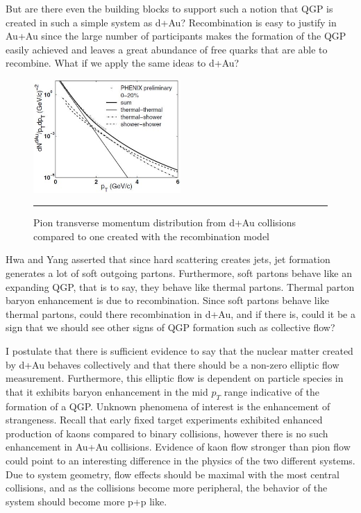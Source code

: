 But are there even the building blocks to support such a notion that QGP is created in such a simple system as d+Au? Recombination is easy to justify in Au+Au since the large number of participants makes the formation of the QGP easily achieved and leaves a great abundance of free quarks that are able to recombine. What if we apply the same ideas to d+Au? 
\begin{figure}[b!]
  \centering
    \includegraphics[width=0.5\textwidth]{prevplots/daurecomb.JPG}
    \rule{35em}{0.5pt}
  \caption[Pion transverse momentum distribution from d+Au collisions compared to one created with the recombination model]{Pion transverse momentum distribution from d+Au collisions compared to one created with the recombination model}
  \label{fig:daaaratios}
\end{figure}
Hwa and Yang asserted \citep{PhysRevLett.93.082302} that since hard scattering creates jets, jet formation generates a lot of soft outgoing partons. Furthermore, soft partons behave like an expanding QGP, that is to say, they behave like thermal partons. Thermal parton baryon enhancement is due to recombination. Since soft partons behave like thermal partons, could there recombination in d+Au, and if there is, could it be a sign that we should see other signs of QGP formation such as collective flow? 

I postulate that there is sufficient evidence to say that the nuclear matter created by d+Au behaves collectively and that there should be a non-zero elliptic flow measurement. Furthermore, this elliptic flow is dependent on particle species in that it exhibits baryon enhancement in the mid $p_T$ range indicative of the formation of a QGP. Unknown phenomena of interest is the enhancement of strangeness. Recall that early fixed target experiments exhibited enhanced production of kaons compared to binary collisions, however there is no such enhancement in Au+Au collisions. Evidence of kaon flow stronger than pion flow could point to an interesting difference in the physics of the two different systems. Due to system geometry, flow effects should be maximal with the most central collisions, and as the collisions become more peripheral, the behavior of the system should become more p+p like.
\pagebreak
\pagebreak
